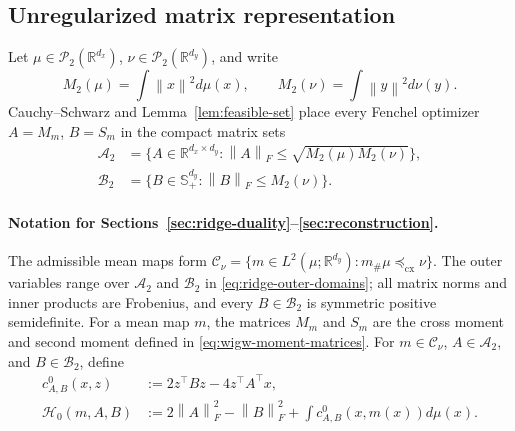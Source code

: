 \documentclass[11pt]{article}
\newcommand{\R}{\mathbb R}
\newcommand{\cP}{\mathcal P}
\newcommand{\norm}[1]{\left\lVert #1\right\rVert}
\newcommand{\cx}{\preceq_{\mathrm{cx}}}
\theoremstyle{plain}
\theoremstyle{definition}
\theoremstyle{remark}
\begin{document}
\subsection{Unregularized matrix representation}

Let \(\mu\in\cP_2(\R^{d_x})\), \(\nu\in\cP_2(\R^{d_y})\), and write
\[
 M_2(\mu)=\int\norm{x}^2d\mu(x),
 \qquad
 M_2(\nu)=\int\norm{y}^2d\nu(y).
\]
Cauchy--Schwarz and Lemma~\ref{lem:feasible-set} place every Fenchel optimizer
\(A=M_m\), \(B=S_m\) in the compact matrix sets
\begin{equation}\label{eq:ridge-outer-domains}
\begin{aligned}
 \mathcal A_2
 &=\{A\in\R^{d_x\times d_y}:\norm{A}_F
     \le\sqrt{M_2(\mu)M_2(\nu)}\},\\
 \mathcal B_2
 &=\{B\in\mathbb S_+^{d_y}:\norm{B}_F\le M_2(\nu)\}.
\end{aligned}
\end{equation}
\paragraph{Notation for Sections~\ref{sec:ridge-duality}--\ref{sec:reconstruction}.}
The admissible mean maps form
\(\mathcal C_\nu=\{m\in L^2(\mu;\R^{d_y}):m_\#\mu\cx\nu\}\).
The outer variables range over \(\mathcal A_2\) and \(\mathcal B_2\) in
\eqref{eq:ridge-outer-domains}; all matrix norms and inner products are Frobenius,
and every \(B\in\mathcal B_2\) is symmetric positive semidefinite. For a mean map
\(m\), the matrices \(M_m\) and \(S_m\) are the cross moment and second moment
defined in \eqref{eq:wigw-moment-matrices}.
For \(m\in\mathcal C_\nu\), \(A\in\mathcal A_2\), and
\(B\in\mathcal B_2\), define
\begin{equation}\label{eq:unregularized-map-matrix-data}
\begin{aligned}
 c_{A,B}^0(x,z)
 &:=2z^\top Bz-4z^\top A^\top x,\\
 \mathcal H_0(m,A,B)
 &:=2\norm A_F^2-\norm B_F^2
   +\int c_{A,B}^0(x,m(x))d\mu(x).
\end{aligned}
\end{equation}
\end{document}
